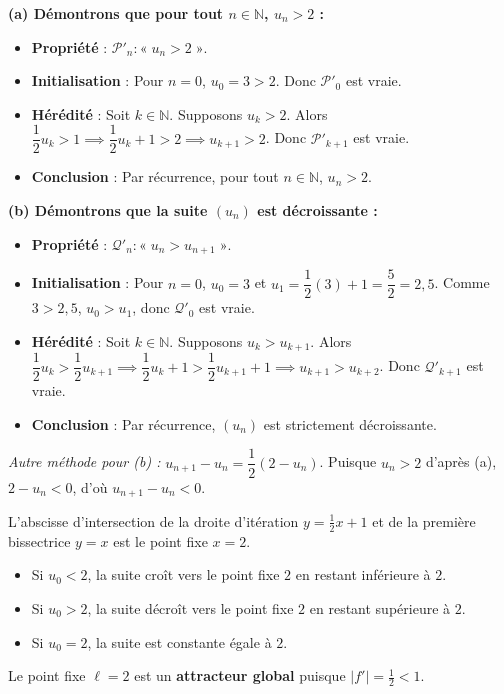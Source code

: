 \documentclass[11pt,a4paper]{article}
\newcommand{\N}{\mathbb{N}}
\begin{document}
\begin{correctionbox}
\textbf{(a) Démontrons que pour tout $n \in \N$, $u_n > 2$ :}
\begin{itemize}
    \item \textbf{Propriété} : $\mathcal{P}'_n : « \; u_n > 2 \; »$.
    \item \textbf{Initialisation} : Pour $n = 0$, $u_0 = 3 > 2$. Donc $\mathcal{P}'_0$ est vraie.
    \item \textbf{Hérédité} : Soit $k \in \N$. Supposons $u_k > 2$.
    Alors $\dfrac{1}{2}u_k > 1 \implies \dfrac{1}{2}u_k + 1 > 2 \implies u_{k+1} > 2$.
    Donc $\mathcal{P}'_{k+1}$ est vraie.
    \item \textbf{Conclusion} : Par récurrence, pour tout $n \in \N$, $u_n > 2$.
\end{itemize}

\textbf{(b) Démontrons que la suite $(u_n)$ est décroissante :}
\begin{itemize}
    \item \textbf{Propriété} : $\mathcal{Q}'_n : « \; u_n > u_{n+1} \; »$.
    \item \textbf{Initialisation} : Pour $n = 0$, $u_0 = 3$ et $u_1 = \dfrac{1}{2}(3) + 1 = \dfrac{5}{2} = 2{,}5$. Comme $3 > 2{,}5$, $u_0 > u_1$, donc $\mathcal{Q}'_0$ est vraie.
    \item \textbf{Hérédité} : Soit $k \in \N$. Supposons $u_k > u_{k+1}$.
    Alors $\dfrac{1}{2}u_k > \dfrac{1}{2}u_{k+1} \implies \dfrac{1}{2}u_k + 1 > \dfrac{1}{2}u_{k+1} + 1 \implies u_{k+1} > u_{k+2}$.
    Donc $\mathcal{Q}'_{k+1}$ est vraie.
    \item \textbf{Conclusion} : Par récurrence, $(u_n)$ est strictement décroissante.
\end{itemize}
\textit{Autre méthode pour (b) :} $u_{n+1} - u_n = \dfrac{1}{2}(2 - u_n)$. Puisque $u_n > 2$ d'après (a), $2 - u_n < 0$, d'où $u_{n+1} - u_n < 0$.
\end{correctionbox}

\begin{remarquabox}[Le point d'équilibre $\ell = 2$]
L'abscisse d'intersection de la droite d'itération $y = \frac{1}{2}x + 1$ et de la première bissectrice $y = x$ est le point fixe $x = 2$.
\begin{itemize}
    \item Si $u_0 < 2$, la suite croît vers le point fixe $2$ en restant inférieure à $2$.
    \item Si $u_0 > 2$, la suite décroît vers le point fixe $2$ en restant supérieure à $2$.
    \item Si $u_0 = 2$, la suite est constante égale à $2$.
\end{itemize}
Le point fixe $\ell = 2$ est un \textbf{attracteur global} puisque $|f'| = \frac{1}{2} < 1$.
\end{remarquabox}
\end{document}
